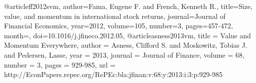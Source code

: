 @article{ff2012svm,
  author={Fama, Eugene F. and French, Kenneth R.},
  title={{Size, value, and momentum in international stock returns}},
  journal={Journal of Financial Economics},
  year=2012,
  volume={105},
  number={3},
  pages={457-472},
  month={},
  doi={10.1016/j.jfineco.2012.05},
}
@article{asness2013vm,
  title = {Value and Momentum Everywhere},
  author = {Asness, Clifford S. and Moskowitz, Tobias J. and Pedersen, Lasse},
  year = {2013},
  journal = {Journal of Finance},
  volume = {68},
  number = {3},
  pages = {929-985},
  url = {http://EconPapers.repec.org/RePEc:bla:jfinan:v:68:y:2013:i:3:p:929-985}
}

